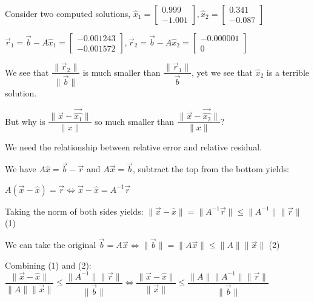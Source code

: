 \documentclass{article}
\begin{document}
Consider two computed solutions, $\hat{x}_{1} = \begin{bmatrix}
0.999\\
-1.001
\end{bmatrix}, \hat{x}_{2} = \begin{bmatrix}
0.341\\
-0.087
\end{bmatrix}$

$\vec{r}_{1} = \vec{b} - A \hat{x}_1 = \begin{bmatrix}
-0.001243\\
-0.001572
\end{bmatrix}, \vec{r}_2 = \vec{b} - A \hat{x}_2 = \begin{bmatrix}
-0.000001\\
0
\end{bmatrix}$

We see that $ \dfrac{\| \vec{r}_2 \|}{\|\vec{b}\|}$ is much smaller than $\dfrac{\| \vec{r}_1 \|}{\vec{b}}$, yet we see that $\hat{x}_2$ is a terrible solution. 

\vspace{0.2cm}

But why is $\dfrac{\| \vec{x} - \vec{\hat{x_1}} \|}{\| x\|}$ so much smaller than $\dfrac{\| \vec{x} - \vec{\hat{x_2}} \|}{\| x\|}$?

\vspace{0.5cm}

We need the relationship between relative error and relative residual.

We have $A \hat{x} = \vec{b} - \vec{r}$ and $A \vec{x} = \vec{b}$, subtract the top from the bottom yields:

$A(\vec{x} - \hat{x}) = \vec{r} \Leftrightarrow \vec{x} - \hat{x} = A^{-1} \vec{r}$

Taking the norm of both sides yields: $\| \vec{x} - \hat{x} \| = \| A^{-1} \vec{r}\| \leq \| A^{-1} \| \| \vec{r} \|$ (1)

We can take the original $\vec{b} = A \vec{x} \Leftrightarrow \| \vec{b} \| = \|A \vec{x} \| \leq \|A \| \| \vec{x} \|$ (2)

\vspace{0.2cm}

Combining (1) and (2): $\dfrac{\| \vec{x} - \hat{x} \|}{ \| A \| \|\vec{x}\|} \leq \dfrac{\|A^{-1} \| \| \vec{r} \|}{\| \vec{b}\|} \Leftrightarrow \dfrac{\| \vec{x} - \hat{x} \|}{ \|\vec{x}\|} \leq \dfrac{\|A \|\|A^{-1} \| \| \vec{r} \|}{\| \vec{b}\|}$

\vspace{0.2cm}
\end{document}
